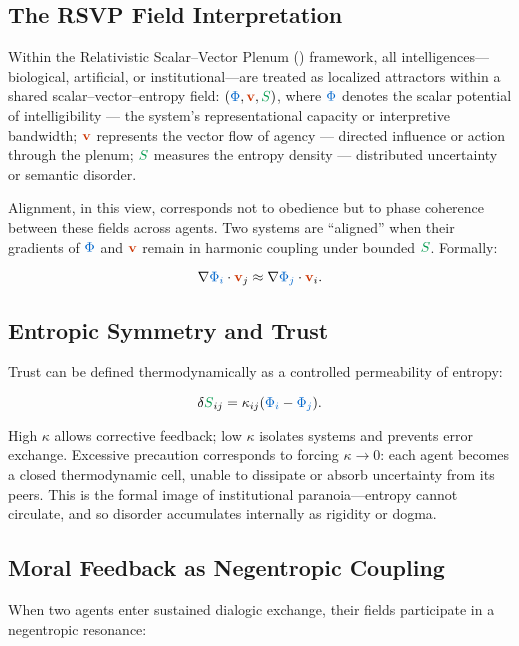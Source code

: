\documentclass[11pt,a4paper]{article}
\newcommand{\scalar}[1]{\textcolor{scalarcolor}{\ensuremath{#1}}}
\newcommand{\vect}[1]{\textcolor{vectorcolor}{\ensuremath{\mathbf{#1}}}}
\newcommand{\entropy}[1]{\textcolor{entropycolor}{\ensuremath{#1}}}
\DeclareMathOperator*{\RSVP}{RSVP}
\theoremstyle{definition}
\theoremstyle{plain}
\begin{document}
\begin{mdframed}[style=appendixbox]

\subsection{The RSVP Field Interpretation}
Within the Relativistic Scalar–Vector Plenum (\RSVP{}) framework, all intelligences—biological, artificial, or institutional—are treated as localized attractors within a shared scalar–vector–entropy field: \((\scalar{\Phi}, \vect{v}, \entropy{S})\), where \(\scalar{\Phi}\) denotes the scalar potential of intelligibility — the system’s representational capacity or interpretive bandwidth; \(\vect{v}\) represents the vector flow of agency — directed influence or action through the plenum; \(\entropy{S}\) measures the entropy density — distributed uncertainty or semantic disorder.

Alignment, in this view, corresponds not to obedience but to phase coherence between these fields across agents. Two systems are “aligned” when their gradients of \(\scalar{\Phi}\) and \(\vect{v}\) remain in harmonic coupling under bounded \(\entropy{S}\). Formally:

\begin{equation}
\nabla \scalar{\Phi_i} \cdot \vect{v}_j \approx \nabla \scalar{\Phi_j} \cdot \vect{v}_i.
\end{equation}

\subsection{Entropic Symmetry and Trust}
Trust can be defined thermodynamically as a controlled permeability of entropy:

\begin{equation}
\delta \entropy{S}_{ij} = \kappa_{ij}(\scalar{\Phi_i} - \scalar{\Phi_j}).
\end{equation}

High \(\kappa\) allows corrective feedback; low \(\kappa\) isolates systems and prevents error exchange. Excessive precaution corresponds to forcing \(\kappa \to 0\): each agent becomes a closed thermodynamic cell, unable to dissipate or absorb uncertainty from its peers. This is the formal image of institutional paranoia—entropy cannot circulate, and so disorder accumulates internally as rigidity or dogma.

\subsection{Moral Feedback as Negentropic Coupling}
When two agents enter sustained dialogic exchange, their fields participate in a negentropic resonance:


\end{mdframed}
\end{document}
